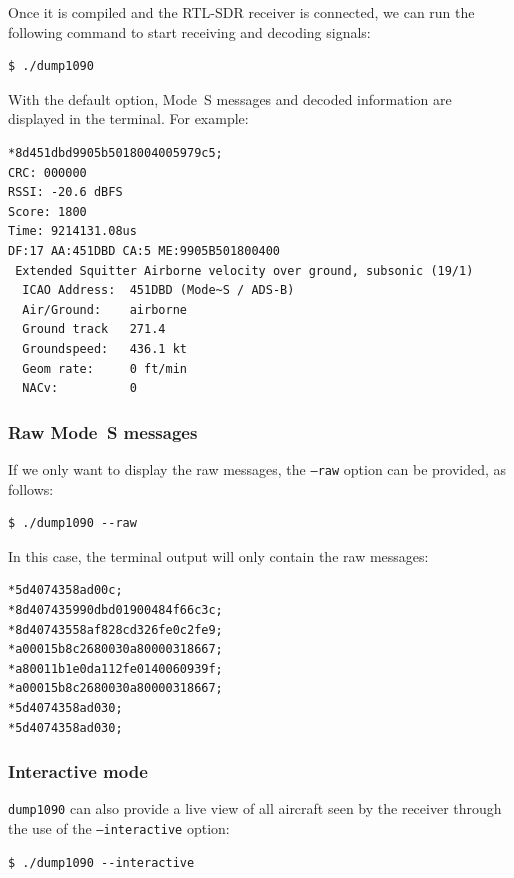 Once it is compiled and the RTL-SDR receiver is connected, we can run the following command to start receiving and decoding signals:

\begin{verbatim}
$ ./dump1090
\end{verbatim}

With the default option, Mode~S messages and decoded information are displayed in the terminal. For example:

\begin{verbatim}
*8d451dbd9905b5018004005979c5;
CRC: 000000
RSSI: -20.6 dBFS
Score: 1800
Time: 9214131.08us
DF:17 AA:451DBD CA:5 ME:9905B501800400
 Extended Squitter Airborne velocity over ground, subsonic (19/1)
  ICAO Address:  451DBD (Mode~S / ADS-B)
  Air/Ground:    airborne
  Ground track   271.4
  Groundspeed:   436.1 kt
  Geom rate:     0 ft/min
  NACv:          0
\end{verbatim}

\subsubsection{Raw Mode~S messages}

If we only want to display the  raw messages, the \texttt{--raw} option can be provided, as follows:

\begin{verbatim}
$ ./dump1090 --raw
\end{verbatim}

In this case, the terminal output will only contain the raw messages:

\begin{verbatim}
*5d4074358ad00c;
*8d407435990dbd01900484f66c3c;
*8d40743558af828cd326fe0c2fe9;
*a00015b8c2680030a80000318667;
*a80011b1e0da112fe0140060939f;
*a00015b8c2680030a80000318667;
*5d4074358ad030;
*5d4074358ad030;
\end{verbatim}

\subsubsection{Interactive mode}

\texttt{dump1090} can also provide a live view of all aircraft seen by the receiver through the use of the \texttt{--interactive} option:

\begin{verbatim}
$ ./dump1090 --interactive
\end{verbatim}

